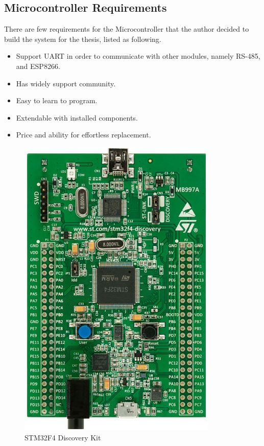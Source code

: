    \subsection{Microcontroller Requirements}
    There are few requirements for the Microcontroller that the author decided to build the system for the thesis, listed as following.
    \begin{itemize}
        \item Support UART in order to communicate with other modules, namely RS-485, and ESP8266.
        \item Has widely support community.
        \item Easy to learn to program.
        \item Extendable with installed components.
        \item Price and ability for effortless replacement.
      \end{itemize}
      \begin{figure}[!ht]
        \begin{center}
        \includegraphics[scale=1]{images/stm32f4_discovery.jpg}
        \caption{STM32F4 Discovery Kit}
        \label{fig:stm32Kit}
        \end{center}
      \end{figure}
